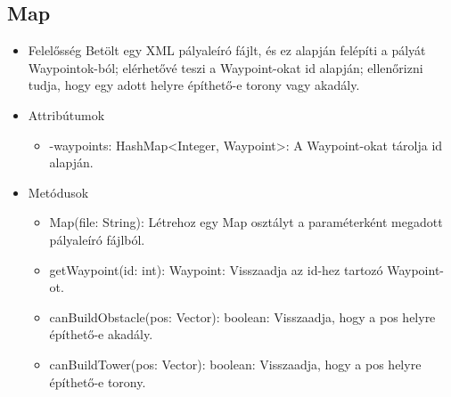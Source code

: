 \subsection{Map}
\begin{itemize}
\item Felelősség\newline
Betölt egy XML pályaleíró fájlt, és ez alapján felépíti a pályát Waypointok-ból; elérhetővé teszi a Waypoint-okat id alapján; ellenőrizni tudja, hogy egy adott helyre építhető-e torony vagy akadály.
\item Attribútumok\newline
	\begin{itemize}
		\item -waypoints: HashMap<Integer, Waypoint>: A Waypoint-okat tárolja id alapján.
	\end{itemize}
\item Metódusok\newline
	\begin{itemize}
		\item Map(file: String): Létrehoz egy Map osztályt a paraméterként megadott pályaleíró fájlból.
		\item getWaypoint(id: int): Waypoint: Visszaadja az id-hez tartozó Waypoint-ot.
		\item canBuildObstacle(pos: Vector): boolean: Visszaadja, hogy a pos helyre építhető-e akadály.
		\item canBuildTower(pos: Vector): boolean: Visszaadja, hogy a pos helyre építhető-e torony.
	\end{itemize}
\end{itemize}


